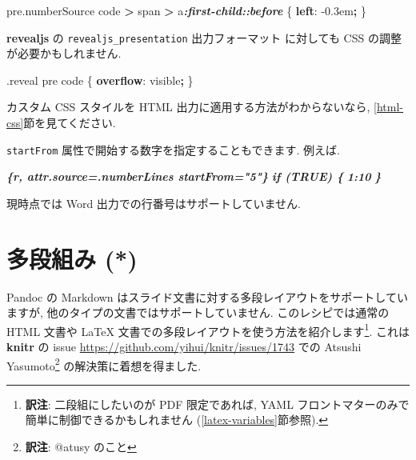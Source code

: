 \documentclass[
  11pt,
  lualatex,
  ja=standard]{bxjsreport}
\newenvironment{Shaded}{\begin{snugshade}}{\end{snugshade}}
\newcommand{\DataTypeTok}[1]{\textcolor[rgb]{0.13,0.29,0.53}{#1}}
\newcommand{\DecValTok}[1]{\textcolor[rgb]{0.00,0.00,0.81}{#1}}
\newcommand{\FunctionTok}[1]{\textcolor[rgb]{0.00,0.00,0.00}{#1}}
\newcommand{\InformationTok}[1]{\textcolor[rgb]{0.56,0.35,0.01}{\textbf{\textit{#1}}}}
\newcommand{\KeywordTok}[1]{\textcolor[rgb]{0.13,0.29,0.53}{\textbf{#1}}}
\newcommand{\NormalTok}[1]{#1}
\newcommand{\OperatorTok}[1]{\textcolor[rgb]{0.81,0.36,0.00}{\textbf{#1}}}
\begin{document}
\begin{Shaded}
\begin{Highlighting}[]
\NormalTok{pre}\FunctionTok{.numberSource}\NormalTok{ code }\OperatorTok{\textgreater{}}\NormalTok{ span }\OperatorTok{\textgreater{}}\NormalTok{ a}\InformationTok{:first{-}child::before}\NormalTok{ \{}
  \KeywordTok{left}\NormalTok{: }\DecValTok{{-}0.3}\DataTypeTok{em}\OperatorTok{;}
\NormalTok{\}}
\end{Highlighting}
\end{Shaded}

\textbf{revealjs} の \texttt{revealjs\_presentation} 出力フォーマット \autocite{R-revealjs} に対しても CSS の調整が必要かもしれません.

\begin{Shaded}
\begin{Highlighting}[]
\FunctionTok{.reveal}\NormalTok{ pre code \{}
  \KeywordTok{overflow}\NormalTok{: }\DecValTok{visible}\OperatorTok{;}
\NormalTok{\}}
\end{Highlighting}
\end{Shaded}

カスタム CSS スタイルを HTML 出力に適用する方法がわからないなら, \ref{html-css}節を見てください.

\texttt{startFrom} 属性で開始する数字を指定することもできます. 例えば.

\begin{Shaded}
\begin{Highlighting}[]
\InformationTok{\textasciigrave{}\textasciigrave{}\textasciigrave{}\{r, attr.source=\textquotesingle{}.numberLines startFrom="5"\textquotesingle{}\}}
\InformationTok{if (TRUE) \{}
\InformationTok{  1:10}
\InformationTok{\}}
\InformationTok{\textasciigrave{}\textasciigrave{}\textasciigrave{}}
\end{Highlighting}
\end{Shaded}

現時点では Word 出力での行番号はサポートしていません.

\hypertarget{multi-column}{%
\section{多段組み (*)}\label{multi-column}}

Pandoc の Markdown はスライド文書に対する多段レイアウトをサポートしていますが, 他のタイプの文書ではサポートしていません. このレシピでは通常の HTML 文書や LaTeX 文書での多段レイアウトを使う方法を紹介します\footnote{\textbf{訳注}: 二段組にしたいのが PDF 限定であれば, YAML フロントマターのみで簡単に制御できるかもしれません (\ref{latex-variables}節参照).}. これは \textbf{knitr} の issue \url{https://github.com/yihui/knitr/issues/1743} での Atsushi Yasumoto\footnote{\textbf{訳注}: @atusy のこと} の解決策に着想を得ました.
\end{document}
